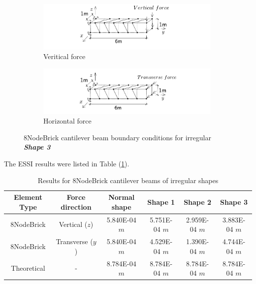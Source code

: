 \documentclass[fleqn,11pt]{article}
\begin{document}
\begin{figure}[H]
  \centering
    \begin{subfigure}{0.5\textwidth}
      \centering
      \includegraphics[width=9cm]{../Figure-files/beam_brick_shape3_vertical.pdf}
      \caption{Veritical force}
    \end{subfigure}
    \begin{subfigure}{0.5\textwidth}
      \centering
      \includegraphics[width=9cm]{../Figure-files/beam_brick_shape3_horizontal.pdf}
      \caption{Horizontal force}
    \end{subfigure}
  \caption{8NodeBrick cantilever beam boundary conditions for irregular \textbf{\emph{Shape 3}} }
  \label{fig 8NodeBrick cantilever beam boundary conditions shape 3}
\end{figure}


The ESSI results were listed in Table (\ref{table Results for 8NodeBrick cantilever beams of irregular shapes}). 
\begin{table}[H]
  \centering
  \caption{Results for 8NodeBrick cantilever beams of irregular shapes}
  \label{table Results for 8NodeBrick cantilever beams of irregular shapes}
  \begin{tabular}{|c|c|c|c|c|c|}
    \hline 
    Element Type   & Force direction & Normal shape & Shape 1 & Shape 2 & Shape 3  \\ \hline 
    8NodeBrick     & Vertical ($z$)     & 5.840E-04 $m$  & 5.751E-04 $m$ & 2.959E-04 $m$ & 3.883E-04 $m$   \\ \hline
    8NodeBrick     & Transverse ($y$)      & 5.840E-04 $m$  & 4.529E-04 $m$ & 1.390E-04 $m$ & 4.744E-04 $m$   \\ \hline
    Theoretical    &      -              & 8.784E-04 $m$  & 8.784E-04 $m$ & 8.784E-04 $m$ & 8.784E-04 $m$ \\ \hline
  \end{tabular}
\end{table}
\end{document}
